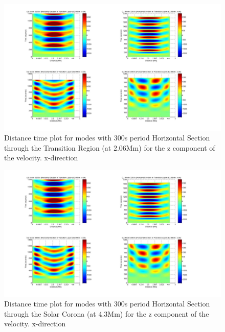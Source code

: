 \documentclass[final,1p]{elsarticle}
\begin{document}
\begin{figure}[h]
\includegraphics[scale=0.3]{imagesn/dt_300_hor_x_2p06Mm.jpg}
\caption{Distance time plot for modes with 300s period Horizontal Section through the Transition Region (at 2.06Mm) for the z  component of the velocity. x-direction}
\end{figure}

\begin{figure}[h]
\includegraphics[scale=0.3]{imagesn/dt_300_hor_x_2p06Mm.jpg}
\caption{Distance time plot for modes with 300s period Horizontal Section through the Solar Corona (at 4.3Mm) for the z  component of the velocity. x-direction}
\end{figure}
\end{document}
